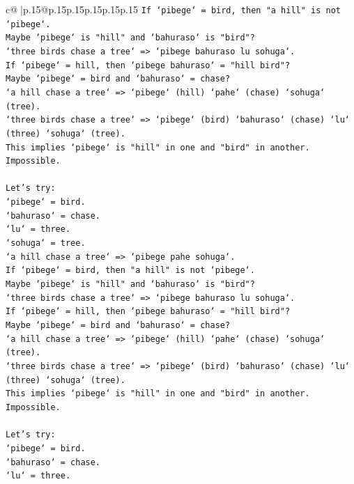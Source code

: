 \documentclass{article}
\begin{document}
{\begin{supertabular}{c@{$\;$}|p{.15\linewidth}@{}p{.15\linewidth}p{.15\linewidth}p{.15\linewidth}p{.15\linewidth}p{.15\linewidth}}
{{{\texttt{If `pibege` = bird, then "a hill" is not `pibege`.} \\
\texttt{Maybe `pibege` is "hill" and `bahuraso` is "bird"?} \\
\texttt{`three birds chase a tree` => `pibege bahuraso lu sohuga`.} \\
\texttt{If `pibege` = hill, then `pibege bahuraso` = "hill bird"?} \\
\texttt{Maybe `pibege` = bird and `bahuraso` = chase?} \\
\texttt{`a hill chase a tree` => `pibege` (hill) `pahe` (chase) `sohuga` (tree).} \\
\texttt{`three birds chase a tree` => `pibege` (bird) `bahuraso` (chase) `lu` (three) `sohuga` (tree).} \\
\texttt{This implies `pibege` is "hill" in one and "bird" in another. Impossible.} \\
\\ 
\texttt{Let's try:} \\
\texttt{`pibege` = bird.} \\
\texttt{`bahuraso` = chase.} \\
\texttt{`lu` = three.} \\
\texttt{`sohuga` = tree.} \\
\texttt{`a hill chase a tree` => `pibege pahe sohuga`.} \\
\texttt{If `pibege` = bird, then "a hill" is not `pibege`.} \\
\texttt{Maybe `pibege` is "hill" and `bahuraso` is "bird"?} \\
\texttt{`three birds chase a tree` => `pibege bahuraso lu sohuga`.} \\
\texttt{If `pibege` = hill, then `pibege bahuraso` = "hill bird"?} \\
\texttt{Maybe `pibege` = bird and `bahuraso` = chase?} \\
\texttt{`a hill chase a tree` => `pibege` (hill) `pahe` (chase) `sohuga` (tree).} \\
\texttt{`three birds chase a tree` => `pibege` (bird) `bahuraso` (chase) `lu` (three) `sohuga` (tree).} \\
\texttt{This implies `pibege` is "hill" in one and "bird" in another. Impossible.} \\
\\ 
\texttt{Let's try:} \\
\texttt{`pibege` = bird.} \\
\texttt{`bahuraso` = chase.} \\
\texttt{`lu` = three.} \\
}}}
\end{supertabular}}
\end{document}
